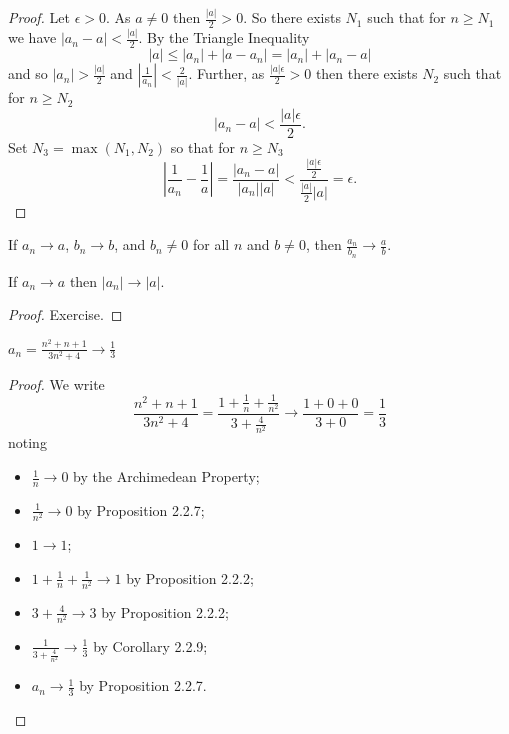 \documentclass[11pt]{article}
\begin{document}
\begin{proof}
	Let $\epsilon > 0$. As $a \neq 0$ then $\frac{|a|}{2} > 0$. So there exists $N_1$ such that for $n \geq N_1$ we have $|a_n - a| < \frac{|a|}{2}$. By the Triangle Inequality
	\[
		|a| \leq |a_n| + |a - a_n| = |a_n| + |a_n - a|
	\]
	and so $|a_n| > \frac{|a|}{2}$ and $\left|\frac{1}{a_n}\right| <
		\frac{2}{|a|}$. Further, as $\frac{|a| \epsilon}{2} > 0$ then there exists
	$N_2$ such that for $n \geq N_2$
	\[
		|a_n - a| < \frac{|a| \epsilon}{2}.
	\]
	Set $N_3 = \max(N_1, N_2)$ so that for $n \geq N_3$
	\[
		\left|\frac{1}{a_n} - \frac{1}{a}\right| = \frac{|a_n - a|}{|a_n| |a|} < \frac{\frac{|a| \epsilon}{2}}{\frac{|a|}{2} |a|} = \epsilon.
	\]
\end{proof}

\begin{corollary}
	If $a_n \to a$, $b_n \to b$, and $b_n \neq 0$ for all $n$ and $b \neq 0$, then $\frac{a_n}{b_n} \to \frac{a}{b}$.
\end{corollary}

\begin{proposition}
	If $a_n \to a$ then $|a_n| \to |a|$.
\end{proposition}

\begin{proof}
	Exercise.
\end{proof}

\begin{example}
	$a_n = \frac{n^2 + n + 1}{3n^2 + 4} \to \frac{1}{3}$
\end{example}

\begin{proof}
	We write
	\[
		\frac{n^2 + n + 1}{3n^2 + 4} = \frac{1 + \frac{1}{n} + \frac{1}{n^2}}{3 + \frac{4}{n^2}} \to \frac{1 + 0 + 0}{3 + 0} = \frac{1}{3}
	\]
	noting
	\begin{itemize}
		\item $\frac{1}{n} \to 0$ by the Archimedean Property;
		\item $\frac{1}{n^2} \to 0$ by Proposition 2.2.7;
		\item $1 \to 1$;
		\item $1 + \frac{1}{n} + \frac{1}{n^2} \to 1$ by Proposition 2.2.2;
		\item $3 + \frac{4}{n^2} \to 3$ by Proposition 2.2.2;
		\item $\frac{1}{3 + \frac{4}{n^2}} \to \frac{1}{3}$ by Corollary 2.2.9;
		\item $a_n \to \frac{1}{3}$ by Proposition 2.2.7.
	\end{itemize}
\end{proof}
\end{document}
